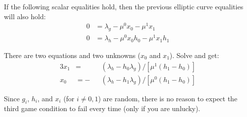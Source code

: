 If the following scalar equalities hold, then the previous elliptic curve equalities will also hold:
\begin{align}
    0 &= \lambda_g - \mu^0 x_0 - \mu^1 x_1 \\
    0 &= \lambda_h - \mu^0 x_0 h_0 - \mu^1 x_1 h_1
\end{align}

There are two equations and two unknowns ($x_0$ and $x_1$). Solve and get:
\begin{alignat}{3}
    x_1 &= &&(\lambda_h - h_0 \lambda_g)/[\mu^1 (h_1 - h_0)] \\
    x_0 &= -&&(\lambda_h - h_1 \lambda_g)/[\mu^0 (h_1 - h_0)]
\end{alignat}

Since $g_i$, $h_i$, and $x_i$ (for $i \neq 0, 1$) are random, there is no reason to expect the third game condition to fail every time (only if you are unlucky).
